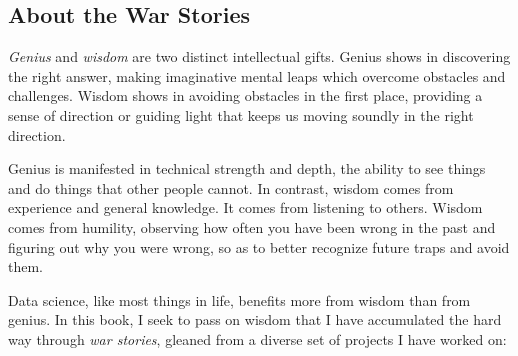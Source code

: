 \documentclass[10pt]{article}
\begin{document}
\subsection{About the War Stories}
\textit{Genius} and \textit{wisdom} are two distinct intellectual gifts. Genius shows in discovering the right answer, making imaginative mental leaps which overcome obstacles and challenges. Wisdom shows in avoiding obstacles in the first place, providing a sense of direction or guiding light that keeps us moving soundly in the right direction.

Genius is manifested in technical strength and depth, the ability to see things and do things that other people cannot. In contrast, wisdom comes from experience and general knowledge. It comes from listening to others. Wisdom comes from humility, observing how often you have been wrong in the past and figuring out why you were wrong, so as to better recognize future traps and avoid them.

Data science, like most things in life, benefits more from wisdom than from genius. In this book, I seek to pass on wisdom that I have accumulated the hard way through \textit{war stories}, gleaned from a diverse set of projects I have worked on:
\end{document}
